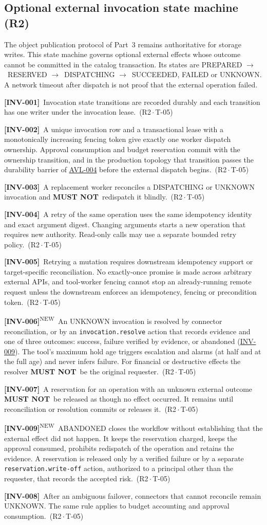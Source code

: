 \documentclass[11pt,a4paper]{article}
\newcommand{\mustnot}{\textbf{MUST NOT}}
\newcommand{\code}[1]{{\small\nolinkurl{#1}}}
\newcommand{\arrowto}{$\rightarrow$}
\newcommand{\rr}[1]{\hyperlink{req:#1}{#1}}
\newcommand{\reqtag}[2]{{\footnotesize\color{accent}(#1\,$\cdot$\,#2)}}
\newcommand{\req}[4]{\par\noindent\hypertarget{req:#1}{\textbf{[#1]}}\ #4\ \reqtag{#2}{#3}\par}
\newcommand{\reqn}[4]{\par\noindent\hypertarget{req:#1}{\textbf{[#1]}}\textsuperscript{\color{accent}\tiny NEW}\ #4\ \reqtag{#2}{#3}\par}
\begin{document}
\subsection{Optional external invocation state machine (R2)}
The object publication protocol of Part~3 remains authoritative for storage writes. This state machine governs optional external effects whose outcome cannot be committed in the catalog transaction. Its states are PREPARED \arrowto\ RESERVED \arrowto\ DISPATCHING \arrowto\ SUCCEEDED, FAILED or UNKNOWN. A network timeout after dispatch is not proof that the external operation failed.
\req{INV-001}{R2}{T-05}{Invocation state transitions are recorded durably and each transition has one writer under the invocation lease.}
\req{INV-002}{R2}{T-05}{A unique invocation row and a transactional lease with a monotonically increasing fencing token give exactly one worker dispatch ownership. Approval consumption and budget reservation commit with the ownership transition, and in the production topology that transition passes the durability barrier of \rr{AVL-004} before the external dispatch begins.}
\req{INV-003}{R2}{T-05}{A replacement worker reconciles a DISPATCHING or UNKNOWN invocation and \mustnot\ redispatch it blindly.}
\req{INV-004}{R2}{T-05}{A retry of the same operation uses the same idempotency identity and exact argument digest. Changing arguments starts a new operation that requires new authority. Read-only calls may use a separate bounded retry policy.}
\req{INV-005}{R2}{T-05}{Retrying a mutation requires downstream idempotency support or target-specific reconciliation. No exactly-once promise is made across arbitrary external APIs, and tool-worker fencing cannot stop an already-running remote request unless the downstream enforces an idempotency, fencing or precondition token.}
\reqn{INV-006}{R2}{T-05}{An UNKNOWN invocation is resolved by connector reconciliation, or by an \code{invocation.resolve} action that records evidence and one of three outcomes: success, failure verified by evidence, or abandoned (\rr{INV-009}). The tool's maximum hold age triggers escalation and alarms (at half and at the full age) and never infers failure. For financial or destructive effects the resolver \mustnot\ be the original requester.}
\req{INV-007}{R2}{T-05}{A reservation for an operation with an unknown external outcome \mustnot\ be released as though no effect occurred. It remains until reconciliation or resolution commits or releases it.}
\reqn{INV-009}{R2}{T-05}{ABANDONED closes the workflow without establishing that the external effect did not happen. It keeps the reservation charged, keeps the approval consumed, prohibits redispatch of the operation and retains the evidence. A reservation is released only by a verified failure or by a separate \code{reservation.write-off} action, authorized to a principal other than the requester, that records the accepted risk.}
\req{INV-008}{R2}{T-05}{After an ambiguous failover, connectors that cannot reconcile remain UNKNOWN. The same rule applies to budget accounting and approval consumption.}
\end{document}

